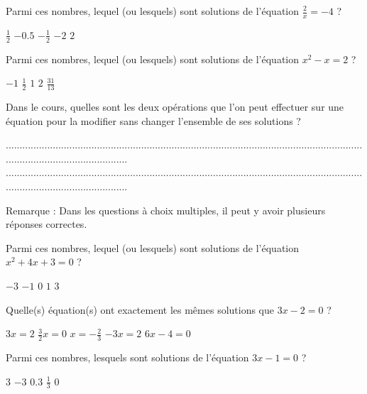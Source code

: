 \documentclass[10pt,a4paper]{exam}
\begin{document}
Parmi ces nombres, lequel (ou lesquels) sont solutions de l'équation   $\frac{2}{x}=-4$ ?\newline
\begin{oneparcheckboxes}
   \choice $\frac{1}{2}$
   \choice $-0.5$
   \choice $-\frac{1}{2}$
   \choice $-2$
   \choice $2$
\end{oneparcheckboxes}
 
Parmi ces nombres, lequel (ou lesquels) sont solutions de l'équation   $x^2 - x = 2$ ?\newline
\begin{oneparcheckboxes}
   \choice $-1$
   \choice $\frac{1}{2}$
   \choice $1$
   \choice $2$
   \choice $\frac{31}{13}$
\end{oneparcheckboxes}
 
Dans le cours, quelles sont les deux opérations que l'on peut effectuer sur une équation pour la modifier sans changer l'ensemble de ses solutions ?

.............................................................................................................................................................................\newline
.............................................................................................................................................................................
 
 
\vspace{20 mm}


Remarque : Dans les questions à choix multiples, il peut y avoir plusieurs réponses correctes.

Parmi ces nombres, lequel (ou lesquels) sont solutions de l'équation   $x^2 + 4x + 3 = 0$ ?\newline
\begin{oneparcheckboxes}
   \choice $-3$
   \choice $-1$
   \choice $0$
   \choice $1$
   \choice $3$
\end{oneparcheckboxes}

 
Quelle(s) équation(s) ont exactement les mêmes solutions que $3x-2=0$ ?\newline
\begin{oneparcheckboxes}
   \choice $3x = 2$
   \choice $\frac{3}{2}x= 0$
   \choice $x= -\frac{2}{3}$
   \choice $-3x = 2$
   \choice $6x-4=0$
\end{oneparcheckboxes}
 

Parmi ces nombres, lesquels sont solutions de l'équation   $3x-1=0$ ?\newline
\begin{oneparcheckboxes}
   \choice $3$
   \choice $-3$
   \choice $0.3$
   \choice $\frac{1}{3}$
   \choice $0$
\end{oneparcheckboxes}
 
\end{document}
